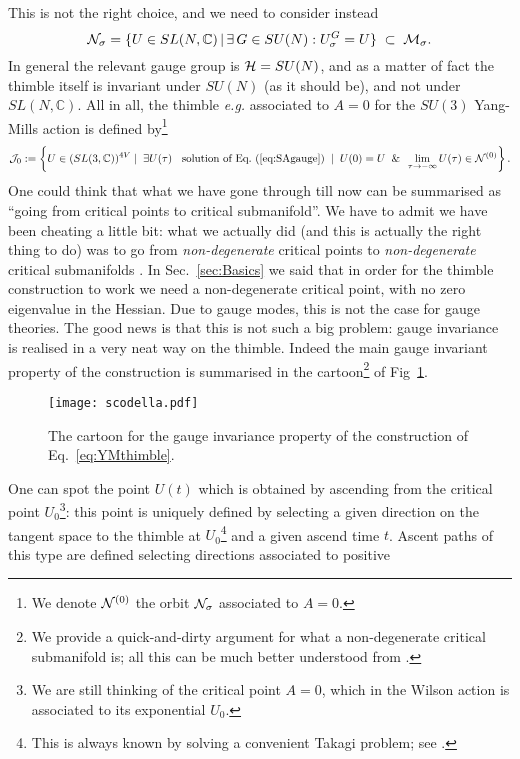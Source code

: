 \documentclass[a4paper,11pt]{article}
\let\mbb\mathbb
\newcommand{\beq}{\begin{equation}}
\newcommand{\eeq}{\end{equation}}
\begin{document}
This is not the right choice, and we need to consider instead
\beq
{\cal N_\sigma} = \{U \in SL(N,\mbb{C}) \,|\, \exists \,G\in SU(N) :
  U_\sigma^G = U\}\; \subset \;{\cal M_\sigma}.
\eeq
In general the relevant gauge group is ${\cal H}=SU(N)$, and as a
matter of fact the thimble itself is invariant under $SU(N)$ (as it
should be), and not under $SL(N,\mbb{C})$. 
All in all, the thimble {\em e.g.} associated to $A=0$ for the
$SU(3)$ Yang-Mills action is defined by\footnote{We denote ${\cal
    N}^{(0)}$ the orbit ${\cal N_\sigma}$ associated to $A=0$.}
\beq \label{eq:YMthimble}
{\cal J}_0:= 
\left\{ 
U\in (SL(3,\mathbb{C}))^{4V} \; | \; \; 
\exists U(\tau) \; \; \mbox{ solution of Eq.~(\ref{eq:SAgauge})}
\; \; | \; \; 
U(0)=U 
\; \; \& \; \; 
\lim_{\tau\rightarrow - \infty} U(\tau) \in {\cal N}^{(0)} 
\right\}.
\eeq
One could think that what we have gone through till now can be summarised as ``going from
critical points to critical submanifold''. We have to
admit we have been cheating a little bit: what we actually did 
(and this is actually the right thing to do) was to
go from {\em non-degenerate} critical points to {\em non-degenerate} 
critical submanifolds \cite{AtBott}. In Sec.~\ref{sec:Basics} we said
that in order for the thimble
construction to work we need a non-degenerate critical point, with no
zero eigenvalue in the Hessian. Due to gauge modes, this
is not the case for gauge theories. The good news is that this is not such a big problem:
gauge invariance is realised in a very neat way on the thimble.
Indeed the main gauge invariant property of the construction is summarised
in the cartoon\footnote{We provide a
  quick-and-dirty argument for what a non-degenerate critical
  submanifold is; all this can be much better
  understood from \cite{AtBott}.} of Fig~\ref{fig:scodella}.
\begin{figure}[ht] 
\centering
\texttt{[image: scodella.pdf]}
\caption{The cartoon for the gauge invariance property of the
  construction of Eq.~{\ref{eq:YMthimble}}.}
\label{fig:scodella}
\end{figure}
One can spot the point $U(t)$ which is obtained by ascending from the
critical point $U_0$\footnote{We are still thinking of the critical
  point $A=0$, which in the Wilson action is associated to its
  exponential $U_0$.}: this point is uniquely defined by selecting a given
direction on the tangent space to the thimble at $U_0$\footnote{This
  is always known by solving a convenient Takagi problem; see
  \cite{thimbleRMT}.} and a given ascend time $t$. Ascent paths of
this type are defined selecting directions associated to positive
\end{document}
